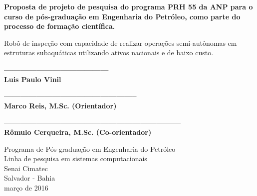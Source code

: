 \begin{center}
  \vspace*{0.8cm}
  {\Large \bf Proposta de projeto de pesquisa do programa PRH 55 da ANP para o curso de pós-graduação em Engenharia do Petróleo, como parte do processo de formação científica.}

  \vspace*{2.5cm}

  {\Large Robô de inspeção com capacidade de realizar operações semi-autônomas em estruturas subaquáticas utilizando ativos nacionais e de baixo custo.}
           \vspace*{2.5cm}
  
  {\bf ---------------------------------------\\
  Luis Paulo Vinil}
  
  \vspace*{1.5cm}
  {\bf --------------------------------------------------\\
  Marco Reis, M.Sc. (Orientador)}
  
   \vspace*{1.5cm}
  {\bf ------------------------------------------------------------------\\
  Rômulo Cerqueira, M.Sc. (Co-orientador)}
  
   \begin{center}
   \end{center}
	\vspace*{0.3cm}

  {Programa de Pós-graduação em Engenharia do Petróleo\\
          [-3mm] Linha de pesquisa em sistemas computacionais\\
          [-3mm] Senai Cimatec\\
          [-3mm] Salvador - Bahia\\
          [-3mm] março de 2016}
\end{center}

\newpage
\thispagestyle{empty}
\begin{center}
 \vspace*{2cm}
\end{center}


